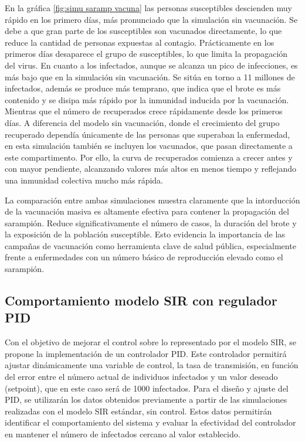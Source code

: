En la gráfica \ref{fig:simu saramp vacuna} las personas susceptibles descienden muy rápido en los primero días, más pronunciado que la simulación sin vacunación. Se debe a que gran parte de los susceptibles son vacunados directamente, lo que reduce la cantidad de personas expuestas al contagio. Prácticamente en los primeros días desaparece el grupo de susceptibles, lo que limita la propagación del virus.
En cuanto a los infectados, aunque se alcanza un pico de infecciones, es más bajo que en la simulación sin vacunación. Se sitúa en torno a 11 millones de infectados, además se produce más temprano, que indica que el brote es más contenido y se disipa más rápido por la inmunidad inducida por la vacunación.
Mientras que el número de recuperados crece rápidamente desde los primeros días. A diferencia del modelo sin vacunación, donde el crecimiento del grupo recuperado dependía únicamente de las personas que superaban la enfermedad, en esta simulación también se incluyen los vacunados, que pasan directamente a este compartimento. Por ello, la curva de recuperados comienza a crecer antes y con mayor pendiente, alcanzando valores más altos en menos tiempo y reflejando una inmunidad colectiva mucho más rápida.

La comparación entre ambas simulaciones muestra claramente que la intorducción de la vacunación masiva es altamente efectiva para contener la propagación del sarampión. Reduce significativamente el número de casos, la duración del brote y la exposición de la población susceptible. Esto evidencia la importancia de las campañas de vacunación como herramienta clave de salud pública, especialmente frente a enfermedades con un número básico de reproducción elevado como el sarampión.


\subsection{Comportamiento modelo SIR con regulador PID}
Con el objetivo de mejorar el control sobre lo representado por el modelo SIR, se propone la implementación de un controlador PID. Este controlador permitirá ajustar dinámicamente una variable de control, la tasa de transmisión, en función del error entre el número actual de individuos infectados y un valor deseado (setpoint), que en este caso será de 1000 infectados. Para el diseño y ajuste del PID, se utilizarán los datos obtenidos previamente a partir de las simulaciones realizadas con el modelo SIR estándar, sin control. Estos datos permitirán identificar el comportamiento del sistema y evaluar la efectividad del controlador en mantener el número de infectados cercano al valor establecido.

